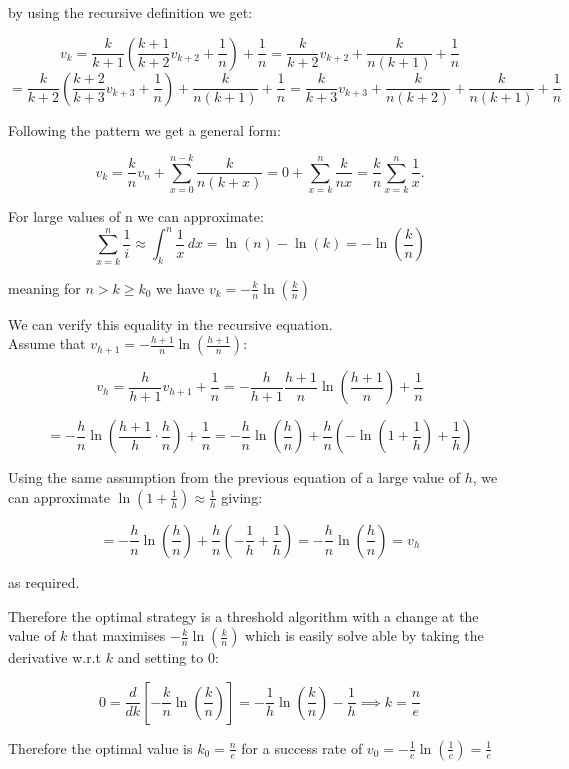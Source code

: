 \documentclass[a4paper,11pt]{article}
\begin{document}
by using the recursive definition we get:

$$
v_k =\frac{k}{k+1}(\frac{k+1}{k+2}v_{k+2} + \frac{1}{n}) + \frac{1}{n}  = 
\frac{k}{k+2}v_{k+2} + \frac{k}{n(k+1)} + \frac{1}{n}
$$
$$
= \frac{k}{k+2}(\frac{k+2}{k+3}v_{k+3} + \frac{1}{n}) + \frac{k}{n(k+1)} + \frac{1}{n} = \frac{k}{k+3}v_{k+3} + \frac{k}{n(k+2)} + \frac{k}{n(k+1)} + \frac{1}{n}
$$

Following the pattern we get a general form:

$$
v_k = \frac{k}{n}v_n + \sum_{x = 0}^{n-k}\frac{k}{n(k+x)} = 0 + \sum_{x = k}^{n}\frac{k}{nx} = \frac{k}{n}\sum_{x = k}^{n}\frac{1}{x}.
$$

For large values of n we can approximate:
$$
\sum_{x = k}^{n}\frac{1}{i} \approx \int_{k}^{n} \frac{1}{x} \,dx 
= \ln(n) - \ln(k) = -\ln(\frac{k}{n})
$$

meaning for $n >k \ge k_0$ we have $v_k = -\frac{k}{n} \ln(\frac{k}{n})$

We can verify this equality in the recursive equation.\\

Assume that $v_{h+1} = -\frac{h+1}{n} \ln(\frac{h+1}{n})$:

$$
v_h = \frac{h}{h+1}v_{h+1} + \frac{1}{n} = -\frac{h}{h+1}\frac{h+1}{n} \ln(\frac{h+1}{n}) + \frac{1}{n} 
$$

$$
= - \frac{h}{n}\ln(\frac{h+1}{h} \cdot \frac{h}{n}) + \frac{1}{n}
= - \frac{h}{n}\ln(\frac{h}{n}) + \frac{h}{n}(-\ln(1+\frac{1}{h}) + \frac{1}{h}) 
$$

Using the same assumption from the previous equation of a large value of $h$, we can approximate $\ln(1+\frac{1}{h})\approx \frac{1}{h}$ giving:

$$
= - \frac{h}{n}\ln\left(\frac{h}{n}\right) + \frac{h}{n}\left(-\frac{1}{h} + \frac{1}{h}\right) =  - \frac{h}{n}\ln\left(\frac{h}{n}\right) = v_h
$$

as required.

Therefore the optimal strategy is a threshold algorithm with a change at the value of $k$ that maximises $ - \frac{k}{n}\ln(\frac{k}{n})$ which is easily solve able by taking the derivative w.r.t $k$ and setting to 0:

$$
0 = \frac{d}{dk}\left[- \frac{k}{n}\ln\left(\frac{k}{n}\right)\right] = -\frac{1}{h}\ln\left(\frac{k}{n}\right) - \frac{1}{h} \implies k = \frac{n}{e}
$$

Therefore the optimal value is $k_0  = \frac{n}{e}$ for a success rate of $v_0 = -\frac{1}{e}\ln(\frac{1}{e}) = \frac{1}{e}$
\end{document}
